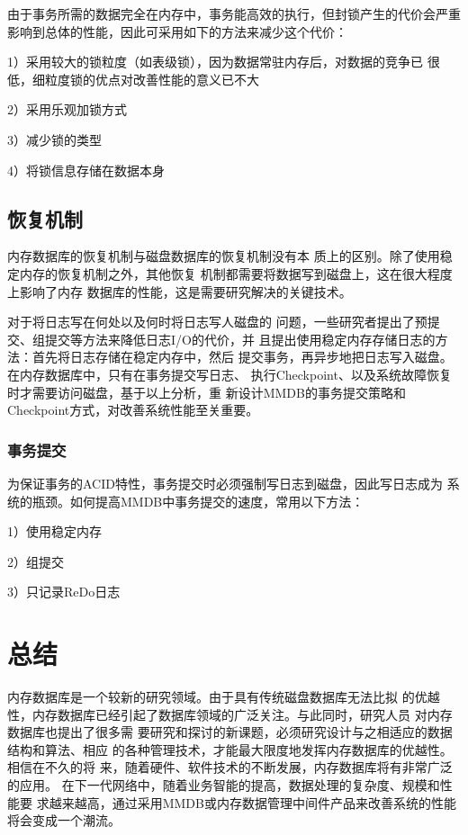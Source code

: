 \documentclass[literaturereview]{zjutreport}
\begin{document}
由于事务所需的数据完全在内存中，事务能高效的执行，但封锁产生的代价会严重影响到总体的性能，因此可采用如下的方法来减少这个代价：

1）采用较大的锁粒度（如表级锁），因为数据常驻内存后，对数据的竞争已
很低，细粒度锁的优点对改善性能的意义已不大

2）采用乐观加锁\cite{ref:15}方式

3）减少锁的类型

4）将锁信息存储在数据本身

\section{恢复机制}
内存数据库的恢复机制\cite{ref:16}与磁盘数据库的恢复机制没有本
质上的区别。除了使用稳定内存的恢复机制之外，其他恢复
机制都需要将数据写到磁盘上，这在很大程度上影响了内存
数据库的性能，这是需要研究解决的关键技术。

对于将日志写在何处以及何时将日志\cite{ref:17}写人磁盘的
问题，一些研究者提出了预提交、组提交等方法来降低日志I/O的代价，并
且提出使用稳定内存存储日志的方法：首先将日志存储在稳定内存中，然后
提交事务，再异步地把日志写入磁盘。在内存数据库中，只有在事务提交写日志、
执行Checkpoint\cite{ref:18}、以及系统故障恢复时才需要访问磁盘，基于以上分析，重
新设计MMDB的事务提交策略和Checkpoint方式，对改善系统性能至关重要。


\subsection{事务提交}
为保证事务的ACID特性，事务提交时必须强制写日志到磁盘，因此写日志成为
系统的瓶颈。如何提高MMDB中事务提交的速度，常用以下方法：

1）使用稳定内存

2）组提交

3）只记录ReDo日志

\chapter{总结}
内存数据库是一个较新的研究领域。由于具有传统磁盘数据库无法比拟
的优越性\cite{ref:19}，内存数据库已经引起了数据库领域的广泛关注。与此同时，研究人员
对内存数据库也提出了很多需
要研究和探讨的新课题，必须研究设计与之相适应的数据结构和算法、相应
的各种管理技术，才能最大限度地发挥内存数据库的优越性。相信在不久的将
来，随着硬件、软件技术的不断发展，内存数据库将有非常广泛的应用\cite{ref:20}。
在下一代网络中，随着业务智能的提高，数据处理的复杂度、规模和性能要
求越来越高，通过采用MMDB或内存数据管理中间件产品来改善系统的性能将会变成一个潮流。

\backmatter
\endgroup %
\clearpage %


\nocite{*}                                   %

\end{document}
